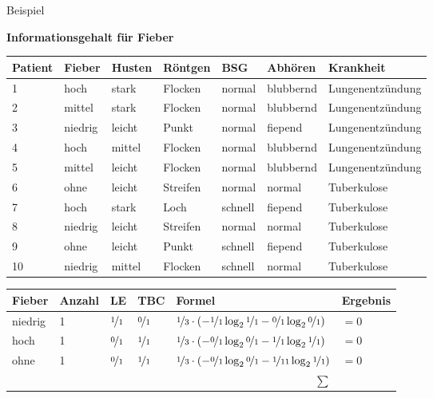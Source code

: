 \begin{frame}{Beispiel}

\textbf{Informationsgehalt für Fieber} \\[1em]

\begin{tabu}{|l l l l l l | l |}\hline
\textbf{Patient} & \textbf{\textcolor{ohmred}{Fieber}} & \textbf{\textcolor{ohmred}{Husten}} & \textbf{\textcolor{ohmred}{Röntgen}} & \textbf{\textcolor{ohmred}{BSG}} & \textbf{\textcolor{ohmred}{Abhören}} &\textbf{\textcolor{ohmgreen}{Krankheit}}\\ \hline
\rowfont{\color{gray}}1 & hoch & stark & Flocken & normal & blubbernd & Lungenentzündung \\
\rowfont{\color{gray}}2 & mittel & stark & Flocken & normal & blubbernd & Lungenentzündung \\
3 & niedrig & leicht & Punkt & normal & fiepend & Lungenentzündung \\
\rowfont{\color{gray}}4 & hoch & mittel & Flocken & normal & blubbernd & Lungenentzündung \\
\rowfont{\color{gray}}5 & mittel & leicht & Flocken & normal & blubbernd & Lungenentzündung \\
\rowfont{\color{gray}}6 & ohne & leicht & Streifen & normal & normal & Tuberkulose \\
7 & hoch & stark & Loch & schnell & fiepend & Tuberkulose \\
\rowfont{\color{gray}}8 & niedrig & leicht & Streifen & normal & normal & Tuberkulose \\
9 & ohne & leicht & Punkt & schnell & fiepend & Tuberkulose \\
\rowfont{\color{gray}}10 & niedrig & mittel & Flocken & schnell & normal & Tuberkulose \\ \hline 
\end{tabu}

\vfill

\begin{tabular}{| l<{\onslide<2->} | l<{\onslide<3->} | l<{\onslide<5->} | l<{\onslide<6->} | l<{\onslide<7->} | l<{\onslide} |}\hline 
\textbf{\textcolor{ohmred}{Fieber}} & \textbf{Anzahl} & \textbf{LE} & \textbf{TBC} & \textbf{Formel} & \textbf{Ergebnis} \\ \hline 
niedrig & 1 & $ \nicefrac{1}{1}$ & $ \nicefrac{0}{1}$ & $ \nicefrac{1}{3} \cdot \left(- \nicefrac{1}{1} \log_2 \nicefrac{1}{1} - \nicefrac{0}{1} \log_2 \nicefrac{0}{1} \right)$ & $=0$\\ \hline 
hoch & 1 & $ \nicefrac{0}{1}$ & $\nicefrac{1}{1}$ & $ \nicefrac{1}{3} \cdot \left(- \nicefrac{0}{1} \log_2 \nicefrac{0}{1} - \nicefrac{1}{1} \log_2 \nicefrac{1}{1} \right)$ & $=0$\\ \hline 
ohne & 1 & $\nicefrac{0}{1}$ & $\nicefrac{1}{1}$ & $\nicefrac{1}{3} \cdot \left(- \nicefrac{0}{1} \log_2 \nicefrac{0}{1} - \nicefrac{1}{11} \log_2 \nicefrac{1}{1} \right)$ & $=0$\\ \hline 
\multicolumn{5}{r|}{$\boldsymbol{\sum}$} & \onslide<7->{$0$} \\ \cline{6-6}
\end{tabular}


\end{frame}


